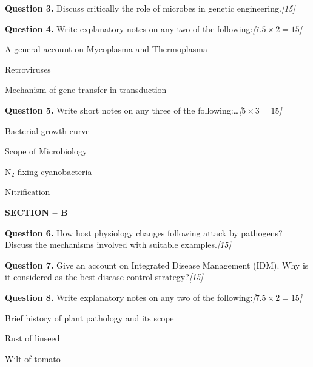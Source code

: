 \documentclass[11pt,a4paper]{article}
\newcommand{\pts}[1]{\hfill   \textit{[#1]}}
\begin{document}
\medskip


\noindent   \textbf{Question 3.} Discuss critically the role of microbes in genetic engineering.\pts{15}

\medskip


\noindent   \textbf{Question 4.} Write explanatory notes on any two of the following:\pts{$7.5  \times 2 = 15$}

\begin{parts}
  \item A general account on Mycoplasma and Thermoplasma
  \item Retroviruses
  \item Mechanism of gene transfer in transduction
\end{parts}

\medskip


\noindent   \textbf{Question 5.} Write short notes on any three of the following:\dots\pts{$5  \times 3 = 15$}

\begin{parts}
  \item Bacterial growth curve
  \item Scope of Microbiology
  \item $ \text{N}_2$ fixing cyanobacteria
  \item Nitrification
\end{parts}

\bigskip

\begin{center}
   \textbf{SECTION -- B}
\end{center}

\medskip


\noindent   \textbf{Question 6.} How host physiology changes following attack by pathogens? Discuss the mechanisms involved with suitable examples.\pts{15}

\medskip


\noindent   \textbf{Question 7.} Give an account on Integrated Disease Management (IDM). Why is it considered as the best disease control strategy?\pts{15}

\medskip


\noindent   \textbf{Question 8.} Write explanatory notes on any two of the following:\pts{$7.5  \times 2 = 15$}

\begin{parts}
  \item Brief history of plant pathology and its scope
  \item Rust of linseed
  \item Wilt of tomato
\end{parts}
\end{document}

